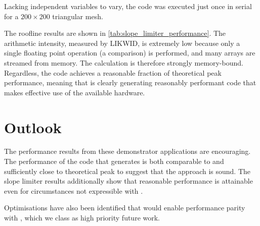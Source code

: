 \documentclass[thesis]{subfiles}
\begin{document}
Lacking independent variables to vary, the code was executed just once in serial for a $200\times200$ triangular mesh.

The roofline results are shown in \cref{tab:slope_limiter_performance}.
The arithmetic intensity, measured by LIKWID, is extremely low because only a single floating point operation (a comparison) is performed, and many arrays are streamed from memory.
The calculation is therefore strongly memory-bound.
Regardless, the code achieves a reasonable fraction of theoretical peak performance, meaning that
 is clearly generating reasonably performant code that makes effective use of the available hardware.

\section{Outlook}

The performance results from these demonstrator applications are encouraging.
The performance of the code that  generates is both comparable to  and sufficiently close to theoretical peak to suggest that the approach is sound.
The slope limiter results additionally show that reasonable performance is attainable even for circumstances not expressible with .

Optimisations have also been identified that would enable performance parity with , which we class as high priority future work.
\end{document}
